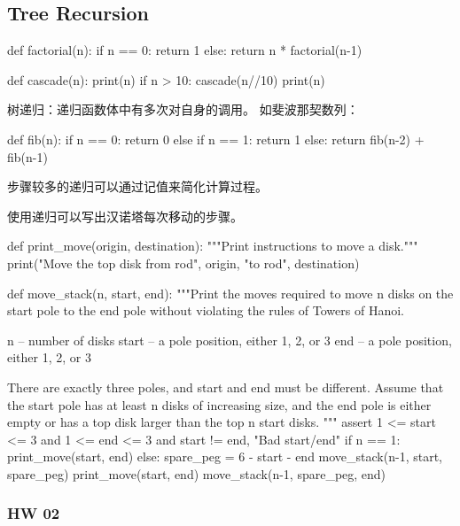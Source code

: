 \documentclass{ctexart}
\begin{document}
\subsection{Tree Recursion}

\begin{python}
    def factorial(n):
        if n == 0:
            return 1
        else:
            return n * factorial(n-1)
\end{python}

\begin{python}
    def cascade(n):
        print(n)
        if n > 10:
            cascade(n//10)
            print(n)
\end{python}

树递归：递归函数体中有多次对自身的调用。
如斐波那契数列：
\begin{python}
    def fib(n):
        if n == 0:
            return 0
        else if n == 1:
            return 1
        else:
            return fib(n-2) + fib(n-1)
\end{python}
步骤较多的递归可以通过记值来简化计算过程。

使用递归可以写出汉诺塔每次移动的步骤。
\begin{python}
    def print_move(origin, destination):
    """Print instructions to move a disk."""
    print("Move the top disk from rod", origin, "to rod", destination)

def move_stack(n, start, end):
    """Print the moves required to move n disks on the start pole to the end
    pole without violating the rules of Towers of Hanoi.

    n -- number of disks
    start -- a pole position, either 1, 2, or 3
    end -- a pole position, either 1, 2, or 3

    There are exactly three poles, and start and end must be different. Assume
    that the start pole has at least n disks of increasing size, and the end
    pole is either empty or has a top disk larger than the top n start disks.
    """
    assert 1 <= start <= 3 and 1 <= end <= 3 and start != end, "Bad start/end"
    if n == 1:
        print_move(start, end)
    else:
        spare_peg = 6 - start - end
        move_stack(n-1, start, spare_peg)
        print_move(start, end)
        move_stack(n-1, spare_peg, end)
\end{python}

\subsubsection{HW 02}
\end{document}
